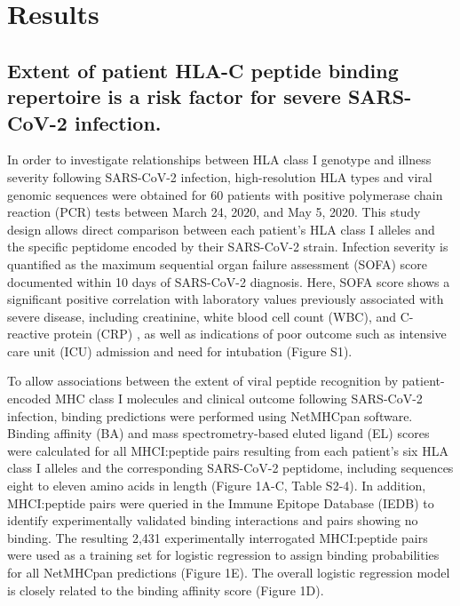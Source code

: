 \documentclass[utf8]{frontiersinFPHY_FAMS} %
\begin{document}
\section{Results}
\subsection*{Extent of patient HLA-C peptide binding repertoire is a risk factor for severe SARS-CoV-2 infection.} In order to investigate relationships between HLA class I genotype and illness severity following SARS-CoV-2 infection, high-resolution HLA types and viral genomic sequences were obtained for 60 patients with positive polymerase chain reaction (PCR) tests between March 24, 2020, and May 5, 2020.  This study design allows direct comparison between each patient’s HLA class I alleles and the specific peptidome encoded by their SARS-CoV-2 strain. Infection severity is quantified as the maximum sequential organ failure assessment (SOFA) score documented within 10 days of SARS-CoV-2 diagnosis. Here, SOFA score shows a significant positive correlation with laboratory values previously associated with severe disease, including creatinine, white blood cell count (WBC), and C-reactive protein (CRP) \citep{32533986}, as well as indications of poor outcome such as intensive care unit (ICU) admission and need for intubation (Figure S1).

To allow associations between the extent of viral peptide recognition by patient-encoded MHC class I molecules and clinical outcome following SARS-CoV-2 infection, binding predictions were performed using NetMHCpan software. Binding affinity (BA) and mass spectrometry-based eluted ligand (EL) scores were calculated for all MHCI:peptide pairs resulting from each patient’s six HLA class I alleles and the corresponding SARS-CoV-2 peptidome, including sequences eight to eleven amino acids in length (Figure 1A-C, Table S2-4). In addition, MHCI:peptide pairs were queried in the Immune Epitope Database (IEDB) to identify experimentally validated binding interactions and pairs showing no binding. The resulting 2,431 experimentally interrogated MHCI:peptide pairs were used as a training set for logistic regression to assign binding probabilities for all NetMHCpan predictions (Figure 1E). The overall logistic regression model is closely related to the binding affinity score (Figure 1D).
\end{document}
